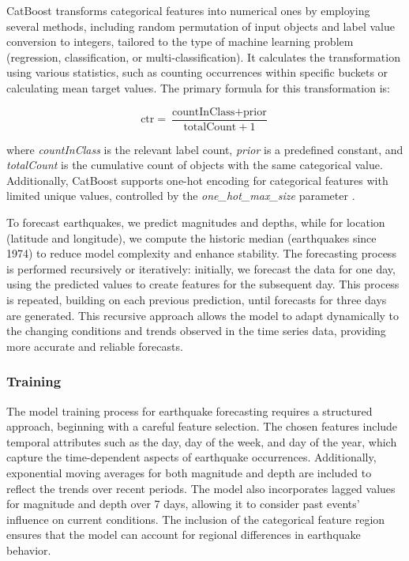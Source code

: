 CatBoost transforms categorical features into numerical ones by employing
several methods, including random permutation of input objects and label
value conversion to integers, tailored to the type of machine learning problem
(regression, classification, or multi-classification). It calculates the
transformation using various statistics, such as counting occurrences within
specific buckets or calculating mean target values. The primary formula for
this transformation is:

\[\text{ctr} = \frac{\text{countInClass} + \text{prior}}{\text{totalCount} + 1}\]

where \textit{countInClass} is the relevant label count, \textit{prior} is a
predefined constant, and \textit{totalCount} is the cumulative count of objects
with the same categorical value. Additionally, CatBoost supports one-hot encoding
for categorical features with limited unique values, controlled by the
\textit{one\_hot\_max\_size} parameter \parencite{catboost-encoding}.

To forecast earthquakes, we predict magnitudes and depths, while for location
(latitude and longitude), we compute the historic median (earthquakes since 1974) to reduce model
complexity and enhance stability. The forecasting process is performed
recursively or iteratively: initially, we forecast the data for one day,
using the predicted values to create features for the subsequent day.
This process is repeated, building on each previous prediction, until
forecasts for three days are generated. This recursive approach allows
the model to adapt dynamically to the changing conditions and trends
observed in the time series data, providing more accurate and reliable forecasts.

\subsubsection{Training}
The model training process for earthquake forecasting requires a structured
approach, beginning with a careful feature selection. The chosen features
include temporal attributes such as the day, day of the week, and day of
the year, which capture the time-dependent aspects of earthquake occurrences.
Additionally, exponential moving averages for both magnitude and depth are
included to reflect the trends over recent periods. The model also incorporates
lagged values for magnitude and depth over 7 days, allowing it to
consider past events' influence on current conditions. The inclusion of the
categorical feature region ensures that the model can account for regional
differences in earthquake behavior.

